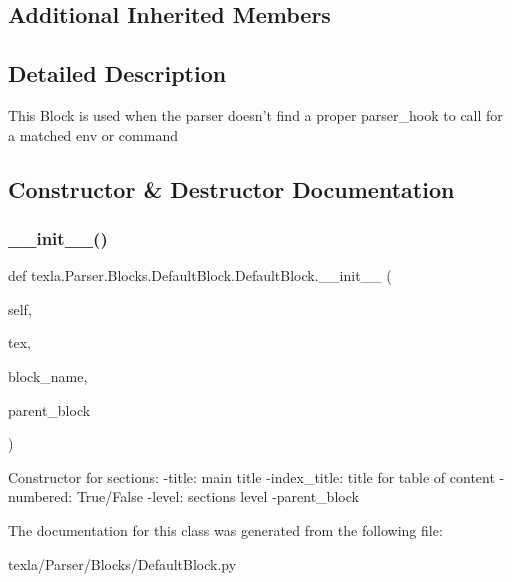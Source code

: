 \subsection*{Additional Inherited Members}


\subsection{Detailed Description}
\begin{DoxyVerb}This Block is used when the parser doesn't find
a proper parser_hook to call for a matched env or command\end{DoxyVerb}
 

\subsection{Constructor \& Destructor Documentation}
\hypertarget{classtexla_1_1Parser_1_1Blocks_1_1DefaultBlock_1_1DefaultBlock_a4425df7cb1f458672c3e733f982f4cd5}{}\label{classtexla_1_1Parser_1_1Blocks_1_1DefaultBlock_1_1DefaultBlock_a4425df7cb1f458672c3e733f982f4cd5} 
\subsubsection{\texorpdfstring{\+\_\+\+\_\+init\+\_\+\+\_\+()}{\_\_init\_\_()}}
{\footnotesize\ttfamily def texla.\+Parser.\+Blocks.\+Default\+Block.\+Default\+Block.\+\_\+\+\_\+init\+\_\+\+\_\+ (\begin{DoxyParamCaption}\item[{}]{self,  }\item[{}]{tex,  }\item[{}]{block\+\_\+name,  }\item[{}]{parent\+\_\+block }\end{DoxyParamCaption})}

\begin{DoxyVerb}Constructor for sections:
-title: main title
-index_title: title for table of content
-numbered: True/False
-level: sections level
-parent_block
\end{DoxyVerb}
 

The documentation for this class was generated from the following file\+:\begin{DoxyCompactItemize}
\item 
texla/\+Parser/\+Blocks/Default\+Block.\+py\end{DoxyCompactItemize}
